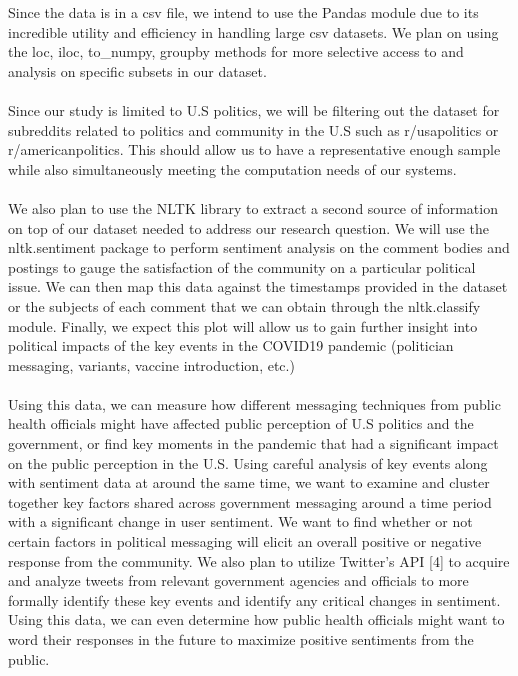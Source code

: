 \documentclass[fontsize=11pt]{article}
\begin{document}
Since the data is in a csv file, we intend to use the Pandas module due to its incredible utility and efficiency in handling large csv datasets. We plan on using the loc, iloc, to\_numpy, groupby methods for more selective access to and analysis on specific subsets in our dataset.
\\\\
Since our study is limited to U.S politics, we will be filtering out the dataset for subreddits related to politics and community in the U.S such as r/usapolitics or r/americanpolitics. This should allow us to have a representative enough sample while also simultaneously meeting the computation needs of our systems.
\\\\
We also plan to use the NLTK library to extract a second source of information on top of our dataset needed to address our research question. We will use the nltk.sentiment package to perform sentiment analysis on the comment bodies and postings to gauge the satisfaction of the community on a particular political issue. We can then map this data against the timestamps provided in the dataset or the subjects of each comment that we can obtain through the nltk.classify module. Finally, we expect this plot will allow us to gain further insight into political impacts of the key events in the COVID19 pandemic (politician messaging, variants, vaccine introduction, etc.)
\\\\
Using this data, we can measure how different messaging techniques from public health officials might have affected public perception of U.S politics and the government, or find key moments in the pandemic that had a significant impact on the public perception in the U.S. Using careful analysis of key events along with sentiment data at around the same time, we want to examine and cluster together key factors shared across government messaging around a time period with a significant change in user sentiment. We want to find whether or not certain factors in political messaging will elicit an overall positive or negative response from the community. We also plan to utilize Twitter’s API [4] to acquire and analyze tweets from relevant government agencies and officials to more formally identify these key events and identify any critical changes in sentiment. Using this data, we can even determine how public health officials might want to word their responses in the future to maximize positive sentiments from the public.
\end{document}
